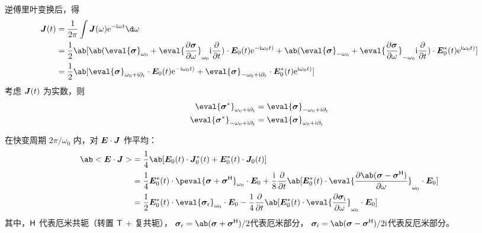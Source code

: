 逆傅里叶变换后，得
\begin{equation}\begin{aligned}
\vector{J}(t) &= \frac{1}{2\pi} \int \vector{J}(\omega) \eu^{-\im\omega t} \d\omega \\
&= \frac{1}{2} \ab[
    \ab(
        \eval{\vector{\sigma}}_{\omega_0}
        + \eval{\pdv{\vector{\sigma}}{\omega}}_{\omega_0} \im \pdv{}{t}
    ) \cdot \vector{E}_0(t) \eu^{-\im\omega_0 t)}
  + \ab(
        \eval{\vector{\sigma}}_{-\omega_0}
        + \eval{\pdv{\vector{\sigma}}{\omega}}_{-\omega_0} \im \pdv{}{t}
    ) \cdot \vector{E}_0^*(t) \eu^{\im\omega_0 t)}
] \\
&= \frac{1}{2} \ab[
    \eval{\vector{\sigma}}_{\omega_0 + \im \pdv{}!{t}}
    \cdot \vector{E}_0(t) \eu^{-\im\omega_0 t)}
  + \eval{\vector{\sigma}}_{-\omega_0 + \im \pdv{}!{t}}
    \cdot \vector{E}_0^*(t) \eu^{\im\omega_0 t)}
]
\end{aligned}\end{equation}
考虑 $\bm{J}(t)$ 为实数，则
\begin{subequations}\begin{align}
\eval{\vector{\sigma}^*}_{\omega_0 + \im \pdv{}!{t}} &
= \eval{\vector{\sigma}}_{-\omega_0 + \im \pdv{}!{t}} \\
\eval{\vector{\sigma}^*}_{-\omega_0 + \im \pdv{}!{t}} &
= \eval{\vector{\sigma}}_{\omega_0 + \im \pdv{}!{t}}
\end{align}\end{subequations}

在快变周期 $2\pi/\omega_0$ 内，对 $\bm{E}\cdot\bm{J}$ 作平均：
\begin{equation}\begin{aligned}
\ab<\vector{E}\cdot\vector{J}> &= \frac{1}{4} \ab[
    \vector{E}_0(t) \cdot \vector{J}_0^*(t)
    + \vector{E}_0^*(t) \cdot \vector{J}_0(t)
] \\
&= \frac{1}{4} \vector{E}_0^*(t) \cdot \peval{
    \vector{\sigma} + \vector{\sigma}^\HT
}_{\omega_0} \cdot \vector{E}_0
+ \frac{\im}{8} \pdv*{\ab[\vector{E}_0^*(t) \cdot \eval{
    \pdv{\ab(\vector{\sigma} - \vector{\sigma}^\HT)}{\omega}
}_{\omega_0} \cdot \vector{E}_0]}{t} \\
&= \frac{1}{2} \vector{E}_0^*(t) \cdot \eval{
    \vector{\sigma}_\re
}_{\omega_0} \cdot \vector{E}_0
- \frac{1}{4} \pdv*{\ab[\vector{E}_0^*(t) \cdot \eval{
    \pdv{\vector{\sigma}_\im}{\omega}
}_{\omega_0} \cdot \vector{E}_0]}{t}
\end{aligned}\end{equation}
其中，$\mathsf{H}$ 代表厄米共轭（转置 $\mathsf{T}$ + 复共轭），
$\vector{\sigma}_\re=\ab(\vector{\sigma}+\vector{\sigma}^\HT)/2$代表厄米部分，
$\vector{\sigma}_\im=\ab(\vector{\sigma}-\vector{\sigma}^\HT)/2\im$代表反厄米部分。

